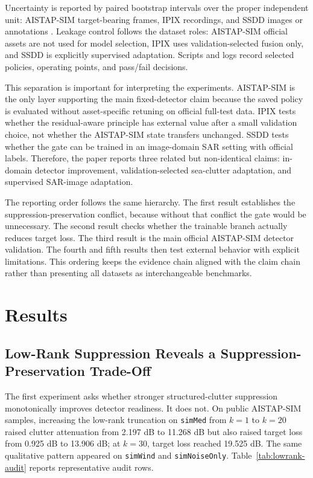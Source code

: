 \documentclass[journal]{IEEEtran}
\begin{document}
Uncertainty is reported by paired bootstrap intervals over the proper independent unit: AISTAP-SIM target-bearing frames, IPIX recordings, and SSDD images or annotations \cite{efron1979bootstrap}. Leakage control follows the dataset roles: AISTAP-SIM official assets are not used for model selection, IPIX uses validation-selected fusion only, and SSDD is explicitly supervised adaptation. Scripts and logs record selected policies, operating points, and pass/fail decisions.

This separation is important for interpreting the experiments. AISTAP-SIM is the only layer supporting the main fixed-detector claim because the saved policy is evaluated without asset-specific retuning on official full-test data. IPIX tests whether the residual-aware principle has external value after a small validation choice, not whether the AISTAP-SIM state transfers unchanged. SSDD tests whether the gate can be trained in an image-domain SAR setting with official labels. Therefore, the paper reports three related but non-identical claims: in-domain detector improvement, validation-selected sea-clutter adaptation, and supervised SAR-image adaptation.

The reporting order follows the same hierarchy. The first result establishes the suppression-preservation conflict, because without that conflict the gate would be unnecessary. The second result checks whether the trainable branch actually reduces target loss. The third result is the main official AISTAP-SIM detector validation. The fourth and fifth results then test external behavior with explicit limitations. This ordering keeps the evidence chain aligned with the claim chain rather than presenting all datasets as interchangeable benchmarks.

\section{Results}

\subsection{Low-Rank Suppression Reveals a Suppression-Preservation Trade-Off}

The first experiment asks whether stronger structured-clutter suppression monotonically improves detector readiness. It does not. On public AISTAP-SIM samples, increasing the low-rank truncation on \texttt{simMed} from $k=1$ to $k=20$ raised clutter attenuation from 2.197 dB to 11.268 dB but also raised target loss from 0.925 dB to 13.906 dB; at $k=30$, target loss reached 19.525 dB. The same qualitative pattern appeared on \texttt{simWind} and \texttt{simNoiseOnly}. Table~\ref{tab:lowrank-audit} reports representative audit rows.
\end{document}
